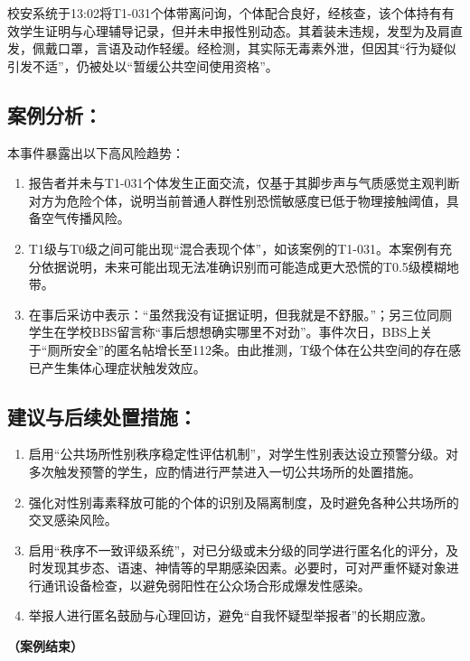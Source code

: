 \documentclass[]{ctexrep}
\begin{document}
	校安系统于13:02将T1-031个体带离问询，个体配合良好，经核查，该个体持有有效学生证明与心理辅导记录，但并未申报性别动态。其着装未违规，发型为及肩直发，佩戴口罩，言语及动作轻缓。经检测，其实际无毒素外泄，但因其“行为疑似引发不适”，仍被处以“暂缓公共空间使用资格”。
	
	\subsection{案例分析：}
	本事件暴露出以下高风险趋势：
	
	\begin{enumerate}
		\item 报告者并未与T1-031个体发生正面交流，仅基于其脚步声与气质感觉主观判断对方为危险个体，说明当前普通人群性别恐慌敏感度已低于物理接触阈值，具备空气传播风险。
		
		\item T1级与T0级之间可能出现“混合表现个体”，如该案例的T1-031。本案例有充分依据说明，未来可能出现无法准确识别而可能造成更大恐慌的T0.5级模糊地带。
		
		\item {}在事后采访中表示：“虽然我没有证据证明，但我就是不舒服。”；另三位同厕学生在学校BBS留言称“事后想想确实哪里不对劲”。事件次日，BBS上关于“厕所安全”的匿名帖增长至112条。由此推测，T级个体在公共空间的存在感已产生集体心理症状触发效应。
	\end{enumerate}
	\subsection{建议与后续处置措施：}
	\begin{enumerate}
		\item 启用“公共场所性别秩序稳定性评估机制”，对学生性别表达设立预警分级。对多次触发预警的学生，应酌情进行严禁进入一切公共场所的处置措施。
		
		\item 强化对性别毒素释放可能的个体的识别及隔离制度，及时避免各种公共场所的交叉感染风险。
		
		\item 启用“秩序不一致评级系统”，对已分级或未分级的同学进行匿名化的评分，及时发现其步态、语速、神情等的早期感染因素。必要时，可对严重怀疑对象进行通讯设备检查，以避免弱阳性在公众场合形成爆发性感染。
		\item 举报人进行匿名鼓励与心理回访，避免“自我怀疑型举报者”的长期应激。
	\end{enumerate}
	\begin{flushright}
		\textbf{（案例结束）}
	\end{flushright}
	
\end{document}
